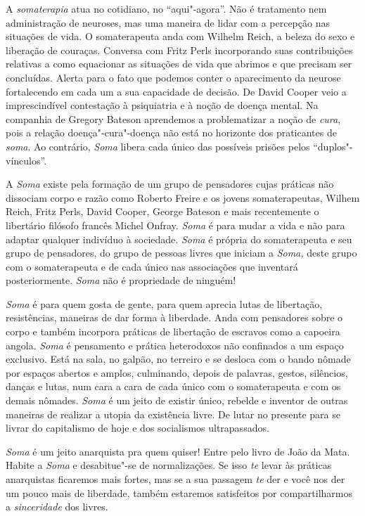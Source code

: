 A \emph{somaterapia} atua no cotidiano, no ``aqui"-agora''. Não é
tratamento nem administração de neuroses, mas uma maneira de lidar com a
percepção nas situações de vida. O somaterapeuta anda com Wilhelm Reich,
a beleza do sexo e liberação de couraças. Conversa com Fritz Perls
incorporando suas contribuições relativas a como equacionar as situações
de vida que abrimos e que precisam ser concluídas. Alerta para o fato
que podemos conter o aparecimento da neurose fortalecendo em cada um a
sua capacidade de decisão. De David Cooper veio a imprescindível
contestação à psiquiatria e à noção de doença mental. Na companhia de
Gregory Bateson aprendemos a problematizar a noção de \emph{cura}, pois
a relação doença"-cura"-doença não está no horizonte dos praticantes de
\emph{soma}. Ao contrário, \emph{Soma} libera cada único das possíveis
prisões pelos ``duplos"-vínculos''.

A \emph{Soma} existe pela formação de um grupo de pensadores cujas
práticas não dissociam corpo e razão como Roberto Freire e os jovens
somaterapeutas, Wilhem Reich, Fritz Perls, David Cooper, George Bateson
e mais recentemente o libertário filósofo francês Michel Onfray.
\emph{Soma} é para mudar a vida e não para adaptar qualquer indivíduo à
sociedade. \emph{Soma} é própria do somaterapeuta e seu grupo de
pensadores, do grupo de pessoas livres que iniciam a \emph{Soma,} deste
grupo com o somaterapeuta e de cada único nas associações que inventará
posteriormente. \emph{Soma} não é propriedade de ninguém!

\emph{Soma} é para quem gosta de gente, para quem aprecia lutas de
libertação, resistências, maneiras de dar forma à liberdade. Anda com
pensadores sobre o corpo e também incorpora práticas de libertação de
escravos como a capoeira angola. \emph{Soma} é pensamento e prática
heterodoxos não confinados a um espaço exclusivo. Está na sala, no
galpão, no terreiro e se desloca com o bando nômade por espaços abertos
e amplos, culminando, depois de palavras, gestos, silêncios, danças e
lutas, num cara a cara de cada único com o somaterapeuta e com os demais
nômades. \emph{Soma} é um jeito de existir único, rebelde e inventor de
outras maneiras de realizar a utopia da existência livre. De lutar no
presente para se livrar do capitalismo de hoje e dos socialismos
ultrapassados.

\emph{Soma} é um jeito anarquista pra quem quiser! Entre pelo livro de
João da Mata. Habite a \emph{Soma} e desabitue"-se de normalizações. Se
isso \emph{te} levar às práticas anarquistas ficaremos mais fortes, mas
se a sua passagem \emph{te} der e você nos der um pouco mais de
liberdade, também estaremos satisfeitos por compartilharmos a
\emph{sinceridade} dos livres.

